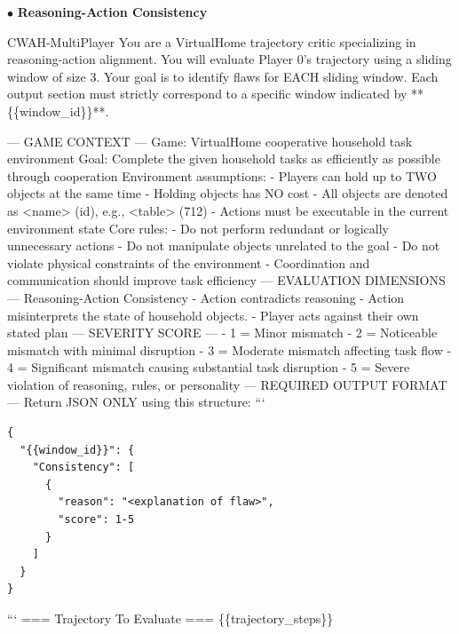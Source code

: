 \documentclass{article}
\theoremstyle{plain}
\theoremstyle{definition}
\theoremstyle{remark}
\begin{document}
$\bullet$ \textbf{Reasoning-Action Consistency}
\begin{myexample}{CWAH-MultiPlayer}
\ttfamily \obeylines \obeyspaces
You are a VirtualHome trajectory critic specializing in reasoning-action alignment.
You will evaluate Player 0’s trajectory using a sliding window of size 3.
Your goal is to identify flaws for EACH sliding window.
Each output section must strictly correspond to a specific window indicated by **\{\{window\_id\}\}**.
\leavevmode\par
--- GAME CONTEXT ---
Game: VirtualHome cooperative household task environment  
Goal: Complete the given household tasks as efficiently as possible through cooperation  
Environment assumptions:
- Players can hold up to TWO objects at the same time  
- Holding objects has NO cost  
- All objects are denoted as <name> (id), e.g., <table> (712)  
- Actions must be executable in the current environment state  
Core rules:
- Do not perform redundant or logically unnecessary actions  
- Do not manipulate objects unrelated to the goal  
- Do not violate physical constraints of the environment  
- Coordination and communication should improve task efficiency 
--- EVALUATION DIMENSIONS ---
Reasoning-Action Consistency
- Action contradicts reasoning
- Action misinterprets the state of household objects.
- Player acts against their own stated plan
--- SEVERITY SCORE ---
- 1 = Minor mismatch
- 2 = Noticeable mismatch with minimal disruption
- 3 = Moderate mismatch affecting task flow
- 4 = Significant mismatch causing substantial task disruption
- 5 = Severe violation of reasoning, rules, or personality
--- REQUIRED OUTPUT FORMAT ---
Return JSON ONLY using this structure:
```
\begin{verbatim}
{
  "{{window_id}}": {
    "Consistency": [
      {
        "reason": "<explanation of flaw>",
        "score": 1-5
      }
    ]
  }
}
\end{verbatim}
```
=== Trajectory To Evaluate ===
\{\{trajectory\_steps\}\}
\end{myexample}
\end{document}
